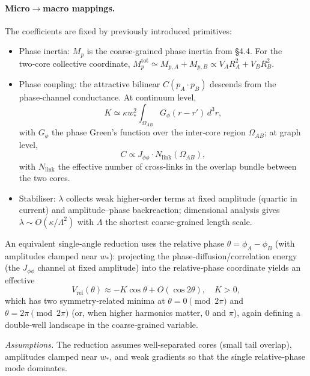 \documentclass[11pt]{article}
\begin{document}
\paragraph{Micro$\to$macro mappings.} The coefficients are fixed by previously introduced primitives:
\begin{itemize}
\item Phase inertia: $M_p$ is the coarse‑grained phase inertia from §4.4. For the two‑core collective coordinate, $M_p^{\text{tot}} \simeq M_{p,A} + M_{p,B} \propto V_A R_A^2 + V_B R_B^2$.
\item Phase coupling: the attractive bilinear $C (p_A\cdot p_B)$ descends from the phase‑channel conductance. At continuum level,
\begin{equation}
K  \simeq  \kappa w_*^2 \int_{\Omega_{AB}} G_\phi(r- r') \, d^3 r,
\end{equation}
with $G_\phi$ the phase Green's function over the inter‑core region $\Omega_{AB}$; at graph level,
\begin{equation}
C  \propto  J_{\phi\phi} \cdot N_{\text{link}}(\Omega_{AB}),
\end{equation}
with $N_{\text{link}}$ the effective number of cross‑links in the overlap bundle between the two cores.
\item Stabiliser: $\lambda$ collects weak higher‑order terms at fixed amplitude (quartic in current) and amplitude–phase backreaction; dimensional analysis gives $\lambda \sim O(\kappa/\Lambda^2)$ with $\Lambda$ the shortest coarse‑grained length scale.
\end{itemize}

An equivalent single‑angle reduction uses the relative phase $\theta = \phi_A - \phi_B$ (with amplitudes clamped near $w_*$): projecting the phase‑diffusion/correlation energy (the $J_{\phi\phi}$ channel at fixed amplitude) into the relative‑phase coordinate yields an effective
\begin{equation}
V_{\text{rel}}(\theta) \approx - K \cos \theta + O(\cos 2\theta), \quad K>0,
\end{equation}
which has two symmetry‑related minima at $\theta = 0 \pmod{2\pi}$ and $\theta = 2\pi \pmod{2\pi}$ (or, when higher harmonics matter, $0$ and $\pi$), again defining a double‑well landscape in the coarse‑grained variable.

\textit{Assumptions.} The reduction assumes well‑separated cores (small tail overlap), amplitudes clamped near $w_*$, and weak gradients so that the single relative‑phase mode dominates.
\end{document}
